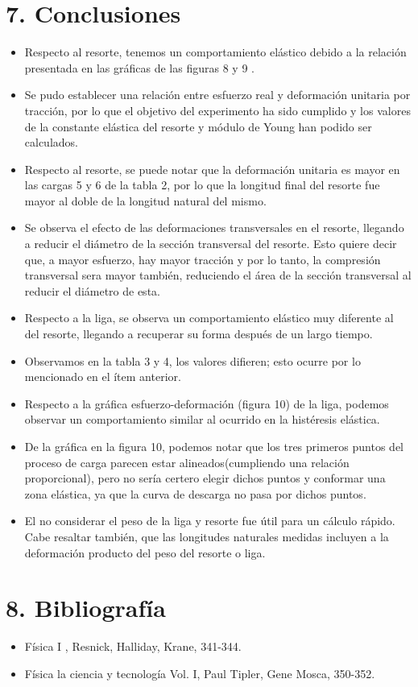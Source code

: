 \documentclass[10pt]{article}
\begin{document}
\section*{7. Conclusiones}
\begin{itemize}
  \item Respecto al resorte, tenemos un comportamiento elástico debido a la relación presentada en las gráficas de las figuras 8 y 9 .
  \item Se pudo establecer una relación entre esfuerzo real y deformación unitaria por tracción, por lo que el objetivo del experimento ha sido cumplido y los valores de la constante elástica del resorte y módulo de Young han podido ser calculados.
  \item Respecto al resorte, se puede notar que la deformación unitaria es mayor en las cargas 5 y 6 de la tabla 2, por lo que la longitud final del resorte fue mayor al doble de la longitud natural del mismo.
  \item Se observa el efecto de las deformaciones transversales en el resorte, llegando a reducir el diámetro de la sección transversal del resorte. Esto quiere decir que, a mayor esfuerzo, hay mayor tracción y por lo tanto, la compresión transversal sera mayor también, reduciendo el área de la sección transversal al reducir el diámetro de esta.
  \item Respecto a la liga, se observa un comportamiento elástico muy diferente al del resorte, llegando a recuperar su forma después de un largo tiempo.
  \item Observamos en la tabla 3 y 4, los valores difieren; esto ocurre por lo mencionado en el ítem anterior.
  \item Respecto a la gráfica esfuerzo-deformación (figura 10) de la liga, podemos observar un comportamiento similar al ocurrido en la histéresis elástica.
  \item De la gráfica en la figura 10, podemos notar que los tres primeros puntos del proceso de carga parecen estar alineados(cumpliendo una relación proporcional), pero no sería certero elegir dichos puntos y conformar una zona elástica, ya que la curva de descarga no pasa por dichos puntos.
  \item El no considerar el peso de la liga y resorte fue útil para un cálculo rápido. Cabe resaltar también, que las longitudes naturales medidas incluyen a la deformación producto del peso del resorte o liga.
\end{itemize}

\section*{8. Bibliografía}
\begin{itemize}
  \item Física I , Resnick, Halliday, Krane, 341-344.
  \item Física la ciencia y tecnología Vol. I, Paul Tipler, Gene Mosca, 350-352.
\end{itemize}
\end{document}
